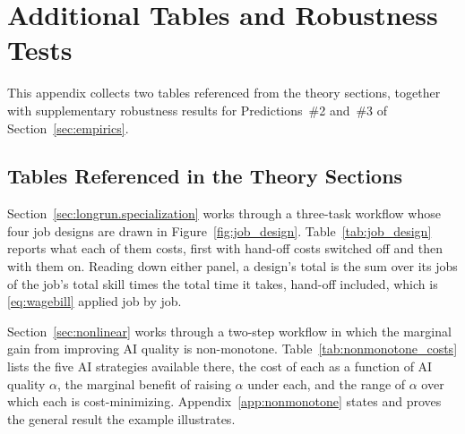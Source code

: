 \section{Additional Tables and Robustness Tests}
\label{app:additional_robustness}

This appendix collects two tables referenced from the theory sections, together with supplementary robustness results for Predictions~\#2 and~\#3 of Section~\ref{sec:empirics}.


\subsection{Tables Referenced in the Theory Sections}
\label{app:theory_tables}
\label{app:jobdesign_example}

Section~\ref{sec:longrun.specialization} works through a three-task workflow whose four job designs are drawn in Figure~\ref{fig:job_design}.
Table~\ref{tab:job_design} reports what each of them costs, first with hand-off costs switched off and then with them on.
Reading down either panel, a design's total is the sum over its jobs of the job's total skill times the total time it takes, hand-off included, which is \eqref{eq:wagebill} applied job by job.

Section~\ref{sec:nonlinear} works through a two-step workflow in which the marginal gain from improving AI quality is non-monotone.
Table~\ref{tab:nonmonotone_costs} lists the five AI strategies available there, the cost of each as a function of AI quality $\alpha$, the marginal benefit of raising $\alpha$ under each, and the range of $\alpha$ over which each is cost-minimizing.
Appendix~\ref{app:nonmonotone} states and proves the general result the example illustrates.

